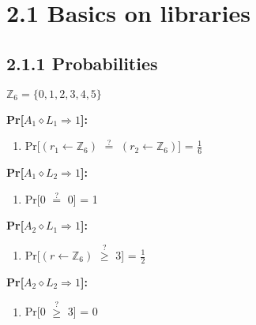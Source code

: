 \documentclass{report}
\begin{document}
	\pagestyle{fancy}
	
	\section*{2.1 Basics on libraries}
	\subsection*{2.1.1 Probabilities}
	$\mathbb{Z}_6 = \{0,1,2,3,4,5\}$ \\
	\begin{compactenum}[$\bullet$]
		\item \textbf{Pr[$A_1 \diamond L_1 \Rightarrow 1$]:}
		\begin{enumerate}[]
			\item Pr[$(r_1 \leftarrow \mathbb{Z}_6)$ $\stackrel{?}{=}$ $(r_2 \leftarrow \mathbb{Z}_6)$] = $\frac{1}{6}$
		\end{enumerate}	
		\item \textbf{Pr[$A_1 \diamond L_2 \Rightarrow 1$]:}
		\begin{enumerate}[]
			\item Pr[0 $\stackrel{?}{=}$ 0] = 1
		\end{enumerate}				
		\item \textbf{Pr[$A_2 \diamond L_1 \Rightarrow 1$]:}
		\begin{enumerate}[]
			\item Pr[$(r \leftarrow \mathbb{Z}_6)$ $\stackrel{?}{\geq}$ 3] = $\frac{1}{2}$
		\end{enumerate}	
		\item \textbf{Pr[$A_2 \diamond L_2 \Rightarrow 1$]:}
		\begin{enumerate}[]
			\item Pr[0 $\stackrel{?}{\geq}$ 3] = 0
		\end{enumerate}	
	\end{compactenum}
\end{document}

